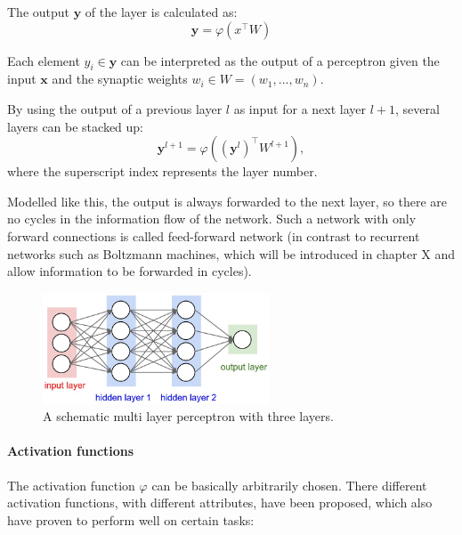 The output $\textbf{y}$ of the layer is calculated as:
\[
\textbf{y} = \varphi(x^\intercal W)
\]

Each element $y_i \in \textbf{y}$ can be interpreted as the output of a perceptron given the input $\textbf{x}$ and the synaptic weights $w_i \in W = (w_1, ... , w_n)$.

By using the output of a previous layer $l$ as input for a next layer $l+1$, several layers can be stacked up: 
\[
\textbf{y}^{l+1} = \varphi ((\textbf{y}^{l})^\intercal W^{l+1} ) ,
\]
where the superscript index represents the layer number. 

Modelled like this, the output is always forwarded to the next layer, so there are no cycles in the information flow of the network.
Such a network with only forward connections is called feed-forward network (in contrast to recurrent networks such as Boltzmann machines, which will be introduced in chapter X and allow information to be forwarded in cycles).

\begin{figure}
	\centering
    	\includegraphics[width=0.6\textwidth]{imgs/mlp.jpeg} 
    \caption{A schematic multi layer perceptron with three layers.}
	\label{fig:mlp}
\end{figure}



\paragraph{Activation functions}

The activation function $\varphi$ can be basically arbitrarily chosen. 
There different activation functions, with different attributes, have been proposed, which also have proven to perform well on certain tasks:

